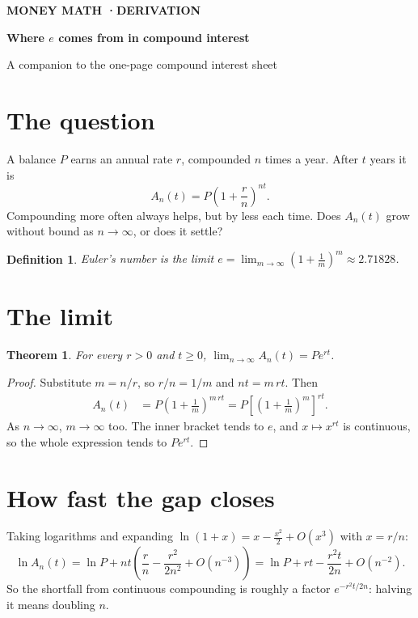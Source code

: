 \documentclass[11pt]{article}
\theoremstyle{seneca}
\newtheorem{theorem}{Theorem}
\newtheorem{definition}{Definition}
\newcommand{\kicker}[1]{{\sffamily\footnotesize\bfseries\color{steel}\MakeUppercase{#1}}}
\begin{document}
\kicker{Money math \quad·\quad derivation}\par
{\sffamily\bfseries\fontsize{24}{28}\selectfont Where $e$ comes from in compound interest\par}
\vspace{2pt}
{\color{steel}A companion to the one-page compound interest sheet}

\section{The question}
A balance $P$ earns an annual rate $r$, compounded $n$ times a year. After $t$ years it is
\begin{equation}\label{eq:discrete}
  A_n(t) = P\left(1 + \frac{r}{n}\right)^{nt}.
\end{equation}
Compounding more often always helps, but by less each time. Does $A_n(t)$ grow without bound as $n \to \infty$,
or does it settle?

\begin{definition}
Euler's number is the limit $\displaystyle e = \lim_{m\to\infty}\left(1 + \frac{1}{m}\right)^{m} \approx 2.71828$.
\end{definition}

\section{The limit}
\begin{theorem}\label{thm:continuous}
For every $r > 0$ and $t \ge 0$, \quad $\displaystyle \lim_{n\to\infty} A_n(t) = P e^{rt}$.
\end{theorem}

\begin{proof}
Substitute $m = n/r$, so $r/n = 1/m$ and $nt = m\,rt$. Then
\begin{align*}
  A_n(t) &= P\left(1 + \frac{1}{m}\right)^{m\,rt}
          = P\left[\left(1 + \frac{1}{m}\right)^{m}\right]^{rt}.
\end{align*}
As $n \to \infty$, $m \to \infty$ too. The inner bracket tends to $e$, and $x \mapsto x^{rt}$ is continuous,
so the whole expression tends to $P e^{rt}$.
\end{proof}

\section{How fast the gap closes}
Taking logarithms and expanding $\ln(1+x) = x - \tfrac{x^2}{2} + O(x^3)$ with $x = r/n$:
\begin{equation}
  \ln A_n(t) = \ln P + nt\left(\frac{r}{n} - \frac{r^2}{2n^2} + O(n^{-3})\right)
             = \ln P + rt - \frac{r^2 t}{2n} + O(n^{-2}).
\end{equation}
So the shortfall from continuous compounding is roughly a factor $e^{-r^2 t / 2n}$: halving it means doubling $n$.
\end{document}
